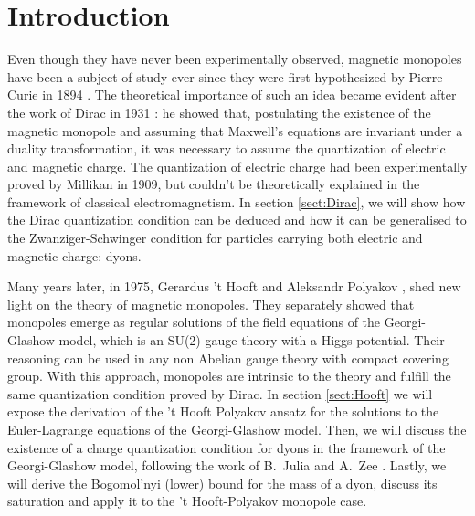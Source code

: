 \documentclass[main.tex]{subfiles}
\begin{document}
\section{Introduction}

Even though they have never been experimentally observed, magnetic monopoles have been a subject of study ever since they were first hypothesized by Pierre Curie in 1894 \cite{Curie:Monopole}.
The theoretical importance of such an idea became evident after the work of Dirac in 1931 \cite{Dirac}: he showed that, postulating the existence of the magnetic monopole and assuming that Maxwell's equations are invariant under a duality transformation, it was necessary to assume the quantization of electric and magnetic charge.
The quantization of electric charge had been experimentally proved by Millikan in 1909, but couldn't be theoretically explained in the framework of classical electromagnetism.
In section \ref{sect:Dirac}, we will show how the Dirac quantization condition can be deduced and how it can be generalised to the Zwanziger-Schwinger condition for particles carrying both electric and magnetic charge: dyons.

Many years later, in 1975, Gerardus 't Hooft \cite{Hof:Mon} and Aleksandr Polyakov \cite{Pol:Mon}, shed new light on the theory of magnetic monopoles.
They separately showed that monopoles emerge as regular solutions of the field equations of the Georgi-Glashow model, which is an SU(2) gauge theory with a Higgs potential.
Their reasoning can be used in any non Abelian gauge theory with compact covering group.
With this approach, monopoles are intrinsic to the theory and fulfill the same quantization condition proved by Dirac.
In section \ref{sect:Hooft} we will expose the derivation of the 't Hooft Polyakov ansatz for the solutions to the Euler-Lagrange equations of the Georgi-Glashow model.
Then, we will discuss the existence of a charge quantization condition for dyons in the framework of the Georgi-Glashow model, following the work of B.\ Julia and A.\ Zee \cite{Julia:Dyon}.
Lastly, we will derive the Bogomol'nyi (lower) bound for the mass of a dyon, discuss its saturation and apply it to the 't Hooft-Polyakov monopole case. 

\end{document}
